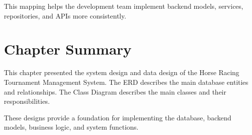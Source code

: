 This mapping helps the development team implement backend models, services, repositories, and APIs more consistently.

\section{Chapter Summary}

This chapter presented the system design and data design of the Horse Racing Tournament Management System. The ERD describes the main database entities and relationships. The Class Diagram describes the main classes and their responsibilities.

These designs provide a foundation for implementing the database, backend models, business logic, and system functions.

